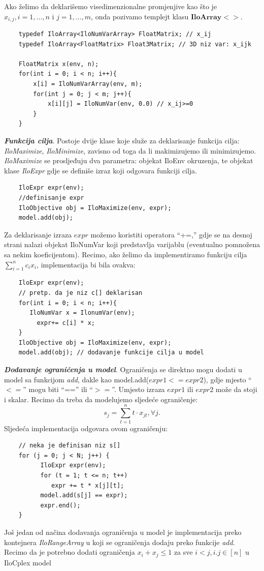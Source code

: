 \documentclass[a4paper, utf8, 11pt, colorlinks]{article}
\begin{document}
 \noindent Ako želimo da deklarišemo visedimenzionalne promjenjive kao što je $x_{i,j}, i=1,...,n$ i $j=1,...,m$, onda pozivamo templejt klasu $\textbf{IloArray}<>$.
 
 \begin{verbatim}
 	typedef IloArray<IloNumVarArray> FloatMatrix; // x_ij 
 	typedef IloArray<FloatMatrix> Float3Matrix; // 3D niz var: x_ijk
 	
 	FloatMatrix x(env, n);
 	for(int i = 0; i < n; i++){
 		x[i] = IloNumVarArray(env, m);
 		for(int j = 0; j < m; j++){
 			x[i][j] = IloNumVar(env, 0.0) // x_ij>=0
 		}
 	}
 \end{verbatim}
 
 \noindent \textbf{\emph{Funkcija cilja}}. 
 Postoje dvije klase koje služe za deklarisanje funkcija cilja: \emph{IloMaximize}, \emph{IloMinimize}, zavisno od toga da li makimizujemo ili minimizujemo. \emph{IloMaximize} se prosljeđuju dva parametra: objekat IloEnv okruzenja, te objekat klase \emph{IloExpr} gdje se definiše  izraz koji odgovara funkciji cilja. 
 
 \begin{verbatim}
 	IloExpr expr(env);
 	//definisanje expr
 	IloObjective obj = IloMaximize(env, expr);
 	model.add(obj);
 \end{verbatim}
 
 \noindent Za deklarisanje izraza $expr$ možemo koristiti operatora ``+=,'' gdje se na desnoj strani nalazi objekat IloNumVar koji predstavlja varijablu (eventualno pomnožena sa nekim koeficijentom). 
 Recimo, ako želimo da implementiramo funkciju cilja $\sum_{i=1}^n c_i x_i$, implementacija bi bila ovakva:
 
 \begin{verbatim}
 	IloExpr expr(env);
 	// pretp. da je niz c[] deklarisan
 	for(int i = 0; i < n; i++){
       IloNumVar x = IlonumVar(env);
 	     expr+= c[i] * x;
 	}
 	IloObjective obj = IloMaximize(env, expr);
 	model.add(obj); // dodavanje funkcije cilja u model
 \end{verbatim}
 
 \noindent \textbf{\emph{Dodavanje ograničenja u model}}. Ograničenja se direktno mogu dodati  u model sa funkcijom \emph{add}, dakle kao 
 model.add($expr1 <= expr2$), gdje mjesto ``$<=$'' mogu biti ``=='' ili ``$>=$''. Umjesto izraza $expr1$ ili $expr2$ može da stoji i skalar. Recimo da treba da modelujemo sljedeće ograničenje:
 $$s_j = \sum_{t=1}^n t \cdot x_{jt}, \forall j.$$ 
 Sljedeća implementacija odgovara ovom ograničenju: 
 \begin{verbatim}
 	// neka je definisan niz s[]
 	for (j = 0; j < N; j++) {
 		  IloExpr expr(env);
 		  for (t = 1; t <= n; t++)
 	  	     expr += t * x[j][t];            
 		  model.add(s[j] == expr);
 		  expr.end();
 	}
 \end{verbatim}
 Još jedan od načina dodavanja ograničenja u model je implementacija preko kontejnera \emph{IloRangeArray} u koji se ograničenja dodaju preko funkcije \emph{add}.   
 Recimo da je potrebno dodati ograničenja $x_i + x_j \leq 1$ za sve $i<j, i.j \in [n]$ u IloCplex model
 
\end{document}
